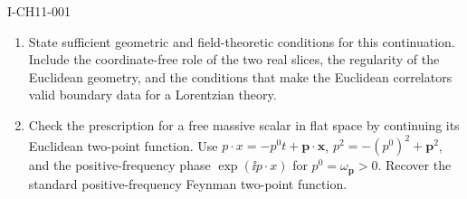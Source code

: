 \begin{exercise}{I-CH11-001}
\begin{enumerate}[label=(\alph*)]
 \item State sufficient geometric and field-theoretic conditions for this
 continuation.  Include the coordinate-free role of the two real slices, the
 regularity of the Euclidean geometry, and the conditions that make the
 Euclidean correlators valid boundary data for a Lorentzian theory.

 \item Check the prescription for a free massive scalar in flat space by
 continuing its Euclidean two-point function.  Use
 $p\mathbin{\cdot}x=-p^0t+\mathbf p\mathbin{\cdot}\mathbf x$,
 $p^2=-(p^0)^2+\mathbf p^2$, and the positive-frequency phase
 $\exp(\ii p\mathbin{\cdot}x)$ for $p^0=\omega_{\mathbf p}>0$.  Recover the
 standard positive-frequency Feynman two-point function.
\end{enumerate}
\end{exercise}
